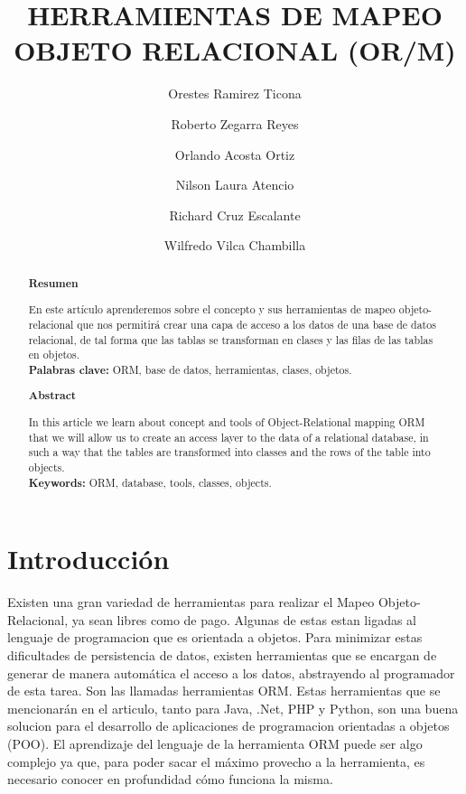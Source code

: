 \documentclass[%
 reprint,
 amsmath,amssymb,
 aps,
]{revtex4-1}
\begin{document}
\title{HERRAMIENTAS DE MAPEO OBJETO RELACIONAL (OR/M)}
\author{Orestes Ramirez Ticona }
\author{Roberto Zegarra Reyes }
\author{Orlando Acosta Ortiz }
\author{Nilson Laura Atencio }
\author{Richard Cruz Escalante }
\author{Wilfredo Vilca Chambilla }
 			
%

\begin{abstract}
\begin{center}
\textbf{Resumen}
\end{center}
En este artículo aprenderemos sobre el concepto y sus herramientas de mapeo objeto-relacional que nos permitirá crear una capa de acceso a los datos de una base de datos relacional, de tal forma que las tablas se transforman en clases y las filas de las tablas en objetos.\\
\textbf{Palabras clave:}   ORM, base de datos, herramientas, clases, objetos.\\

\begin{center}
\textbf{Abstract}
\end{center}
In this article we learn about concept and tools of Object-Relational mapping ORM that we will allow us to create an access layer to the data of a relational database, in such a way that the tables are transformed into classes and the rows of the table into objects.\\
\textbf{Keywords:}   ORM, database, tools, classes, objects.

\end{abstract}



\maketitle


\section {Introducción}\label{sec:1}
Existen una gran variedad de herramientas para realizar el Mapeo Objeto-Relacional, ya sean libres como de pago. Algunas de estas estan ligadas al lenguaje de programacion que es orientada a objetos. Para minimizar estas dificultades de persistencia de datos, existen herramientas que se encargan de generar de manera automática el acceso a los datos, abstrayendo al programador de esta tarea. Son las llamadas herramientas ORM.
Estas herramientas que se mencionarán en el articulo, tanto para Java, .Net, PHP y Python, son una buena solucion para el desarrollo de aplicaciones de programacion orientadas a objetos (POO). 
El aprendizaje del lenguaje de la herramienta ORM puede ser algo complejo ya que, para poder sacar el máximo provecho a la herramienta, es necesario conocer en profundidad cómo funciona la misma.
\end{document}
